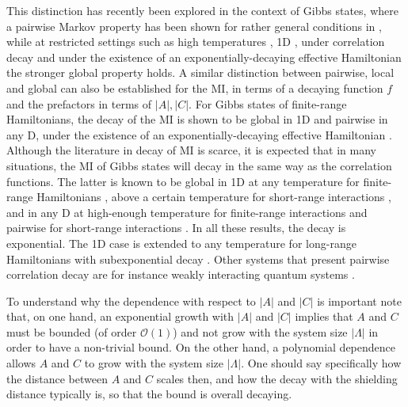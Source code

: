 \documentclass[11pt]{article}
\numberwithin{equation}{section}
\numberwithin{figure}{section}
\numberwithin{table}{section}
\theoremstyle{definition}
\theoremstyle{plain}
\theoremstyle{remark}
\newcommand{\La}{\Lambda}
\newcommand{\abs}[1]{\left \vert#1\right\vert}
\begin{document}
This distinction has recently been explored in the context of Gibbs states, where a pairwise Markov property has been shown for rather general conditions in  \cite{Kuw24,chen_quantum_2025,bergamaschi2025structuraltheoryquantummetastability}, while at restricted settings such as high temperatures \cite{kato_clustering_2025,bakshi_dobrushin_2025}, 1D \cite{Kato2019,Kuw24}, under correlation decay \cite{chen2026notestrongquantummarkov} and under the existence of an exponentially-decaying effective Hamiltonian \cite{scalet2025classicalestimationfreeenergy} the stronger global property holds. A similar distinction between pairwise, local and global can also be established for the MI, in terms of a decaying function $f$ and the prefactors in terms of $\vert A\vert, \vert C \vert$. For Gibbs states of finite-range Hamiltonians, the decay of the MI is shown to be global in 1D \cite{Bluhm_2022} and pairwise in any D, under the existence of an exponentially-decaying effective Hamiltonian \cite{BCP2024}. Although the literature in decay of MI is scarce, it is expected that in many situations, the MI of Gibbs states will decay in the same way as the correlation functions. The latter is known to be global in 1D at any temperature for finite-range Hamiltonians \cite{Ara69}, above a certain temperature for short-range interactions \cite{Alhambra_2026}, and in any D at high-enough temperature for finite-range interactions \cite{Kliesch2014} and pairwise for short-range interactions \cite{Ueltschi2004}. In all these results, the decay is exponential. The 1D case is extended to any temperature for long-range Hamiltonians with subexponential decay \cite{kimura_clustering_2025}. Other systems that present pairwise correlation decay are for instance weakly interacting quantum systems \cite{adhikari2026uniformintemperaturelocalityestimatesweakly}. 



To understand why the dependence with respect to $\abs{A}$ and $\abs{C}$ is important note that, on one hand, an exponential growth with $\abs{A}$ and $\abs{C}$ implies that $A$ and $C$ must be bounded (of order $\mathcal{O}(1)$) and not grow with the system size $\abs{\La}$ in order to have a non-trivial bound. On the other hand, a polynomial dependence allows $A$ and $C$ to grow with the system size $\abs{\La}$. One should say specifically how the distance between $A$ and $C$ scales then, and how the decay with the shielding distance typically is, so that the bound is overall decaying.
\end{document}
